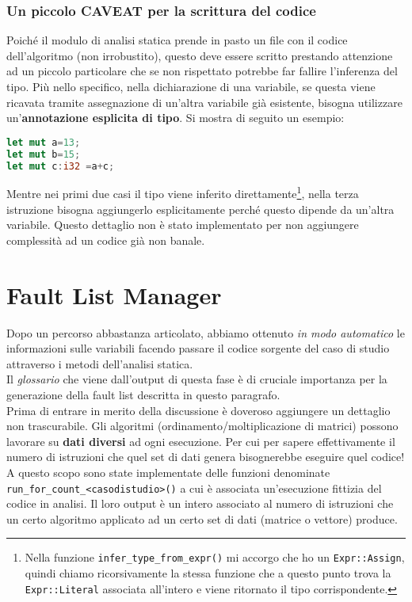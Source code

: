 \subsubsection{Un piccolo CAVEAT per la scrittura del codice}
Poiché il modulo di analisi statica prende in pasto un file con il codice dell'algoritmo (non irrobustito), questo deve essere scritto prestando attenzione ad un piccolo particolare che se non rispettato potrebbe far fallire l'inferenza del tipo. Più nello specifico, nella dichiarazione di una variabile, se questa viene ricavata tramite assegnazione di un'altra variabile già esistente, bisogna utilizzare un'\textbf{annotazione esplicita di tipo}. Si mostra di seguito un esempio: 
\begin{lstlisting}[language=rust, style=boxed]
let mut a=13; 
let mut b=15; 
let mut c:i32 =a+c; 
\end{lstlisting}
Mentre nei primi due casi il tipo viene inferito direttamente\footnote{
    Nella funzione \texttt{infer\_type\_from\_expr()} mi accorgo che ho un \texttt{Expr::Assign}, quindi chiamo ricorsivamente la stessa funzione che a questo punto trova la \texttt{Expr::Literal} associata all'intero e viene ritornato il tipo corrispondente.
}, nella terza istruzione bisogna aggiungerlo esplicitamente perché questo dipende da un'altra variabile. Questo dettaglio non è stato implementato per non aggiungere complessità ad un codice già non banale.


\section{Fault List Manager}\label{sec:FLM}
Dopo un percorso abbastanza articolato, abbiamo ottenuto \textit{in modo automatico} le informazioni sulle variabili facendo passare il codice sorgente del caso di studio attraverso i metodi dell'analisi statica. \\
Il \textit{glossario} che viene dall'output di questa fase è di cruciale importanza per la generazione della fault list descritta in questo paragrafo. \\
Prima di entrare in merito della discussione è doveroso aggiungere un dettaglio non trascurabile. Gli algoritmi (ordinamento/moltiplicazione di matrici) possono lavorare su \textbf{dati diversi} ad ogni esecuzione. Per cui per sapere effettivamente il numero di istruzioni che quel set di dati genera bisognerebbe eseguire quel codice! A questo scopo sono state implementate delle funzioni denominate \texttt{run\_for\_count\_<casodistudio>()} a cui è associata  un'esecuzione fittizia del codice in analisi. Il loro output è un intero associato al numero di istruzioni che un certo algoritmo applicato ad un certo set di dati (matrice o vettore) produce.\\

